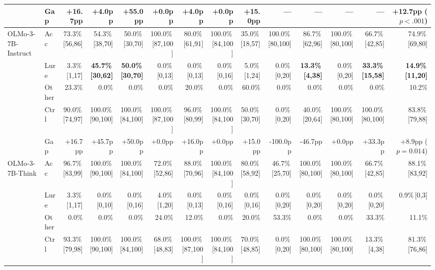 \begin{table}[t]
{\begin{tabular}{l l r r r r r r r r r r r r}
 & Gap & +16.7pp & +4.0pp & +55.0pp & +0.0pp & +4.0pp & +0.0pp & +15.0pp & --- & --- & --- & --- & +12.7pp ($p < .001$) \\
\midrule
OLMo-3-7B-Instruct & Acc & 73.3\%\,{\tiny [56,86]} & 54.3\%\,{\tiny [38,70]} & 50.0\%\,{\tiny [30,70]} & 100.0\%\,{\tiny [87,100]} & 80.0\%\,{\tiny [61,91]} & 100.0\%\,{\tiny [84,100]} & 35.0\%\,{\tiny [18,57]} & 100.0\%\,{\tiny [80,100]} & 86.7\%\,{\tiny [62,96]} & 100.0\%\,{\tiny [80,100]} & 66.7\%\,{\tiny [42,85]} & 74.9\%\,{\tiny [69,80]} \\
 & Lure & 3.3\%\,{\tiny [1,17]} & \textbf{45.7\%\,{\tiny [30,62]}} & \textbf{50.0\%\,{\tiny [30,70]}} & 0.0\%\,{\tiny [0,13]} & 0.0\%\,{\tiny [0,13]} & 0.0\%\,{\tiny [0,16]} & 5.0\%\,{\tiny [1,24]} & 0.0\%\,{\tiny [0,20]} & \textbf{13.3\%\,{\tiny [4,38]}} & 0.0\%\,{\tiny [0,20]} & \textbf{33.3\%\,{\tiny [15,58]}} & \textbf{14.9\%\,{\tiny [11,20]}} \\
 & Other & 23.3\% & 0.0\% & 0.0\% & 0.0\% & 20.0\% & 0.0\% & 60.0\% & 0.0\% & 0.0\% & 0.0\% & 0.0\% & 10.2\% \\
 & Ctrl & 90.0\%\,{\tiny [74,97]} & 100.0\%\,{\tiny [90,100]} & 100.0\%\,{\tiny [84,100]} & 100.0\%\,{\tiny [87,100]} & 96.0\%\,{\tiny [80,99]} & 100.0\%\,{\tiny [84,100]} & 50.0\%\,{\tiny [30,70]} & 0.0\%\,{\tiny [0,20]} & 40.0\%\,{\tiny [20,64]} & 100.0\%\,{\tiny [80,100]} & 100.0\%\,{\tiny [80,100]} & 83.8\%\,{\tiny [79,88]} \\
 & Gap & +16.7pp & +45.7pp & +50.0pp & +0.0pp & +16.0pp & +0.0pp & +15.0pp & -100.0pp & -46.7pp & +0.0pp & +33.3pp & +8.9pp ($p = 0.014$) \\
\midrule
OLMo-3-7B-Think & Acc & 96.7\%\,{\tiny [83,99]} & 100.0\%\,{\tiny [90,100]} & 100.0\%\,{\tiny [84,100]} & 72.0\%\,{\tiny [52,86]} & 88.0\%\,{\tiny [70,96]} & 100.0\%\,{\tiny [84,100]} & 80.0\%\,{\tiny [58,92]} & 46.7\%\,{\tiny [25,70]} & 100.0\%\,{\tiny [80,100]} & 100.0\%\,{\tiny [80,100]} & 66.7\%\,{\tiny [42,85]} & 88.1\%\,{\tiny [83,92]} \\
 & Lure & 3.3\%\,{\tiny [1,17]} & 0.0\%\,{\tiny [0,10]} & 0.0\%\,{\tiny [0,16]} & 4.0\%\,{\tiny [1,20]} & 0.0\%\,{\tiny [0,13]} & 0.0\%\,{\tiny [0,16]} & 0.0\%\,{\tiny [0,16]} & 0.0\%\,{\tiny [0,20]} & 0.0\%\,{\tiny [0,20]} & 0.0\%\,{\tiny [0,20]} & 0.0\%\,{\tiny [0,20]} & 0.9\%\,{\tiny [0,3]} \\
 & Other & 0.0\% & 0.0\% & 0.0\% & 24.0\% & 12.0\% & 0.0\% & 20.0\% & 53.3\% & 0.0\% & 0.0\% & 33.3\% & 11.1\% \\
 & Ctrl & 93.3\%\,{\tiny [79,98]} & 100.0\%\,{\tiny [90,100]} & 100.0\%\,{\tiny [84,100]} & 68.0\%\,{\tiny [48,83]} & 100.0\%\,{\tiny [87,100]} & 100.0\%\,{\tiny [84,100]} & 70.0\%\,{\tiny [48,85]} & 0.0\%\,{\tiny [0,20]} & 100.0\%\,{\tiny [80,100]} & 100.0\%\,{\tiny [80,100]} & 13.3\%\,{\tiny [4,38]} & 81.3\%\,{\tiny [76,86]} \\

\end{tabular}}
\end{table}
